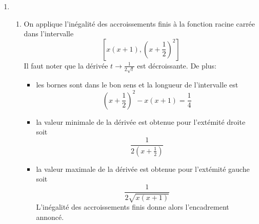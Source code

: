 \begin{enumerate}
 \item
\begin{enumerate}
 \item On applique l'inégalité des accroissements finis à la fonction racine carrée dans l'intervalle 
\begin{displaymath}
 \left[ x(x+1), (x+\frac{1}{2})^2\right] 
\end{displaymath}
Il faut noter que la dérivée $t\rightarrow \frac{1}{2\sqrt{t}}$ est décroissante. De plus:
\begin{itemize}
 \item les bornes sont dans le bon sens et la longueur de l'intervalle est
\begin{displaymath}
 (x+\frac{1}{2})^2-x(x+1)=\frac{1}{4}
\end{displaymath}

 \item la valeur minimale de la dérivée est obtenue pour l'extémité droite soit
\begin{displaymath}
 \frac{1}{2(x+\frac{1}{2})}
\end{displaymath}
 \item la valeur maximale de la dérivée est obtenue pour l'extémité gauche soit
\begin{displaymath}
 \frac{1}{2\sqrt{x(x+1)}}
\end{displaymath}
L'inégalité des accroissements finis donne alors l'encadrement annoncé.
\end{itemize}


\end{enumerate}
\end{enumerate}

